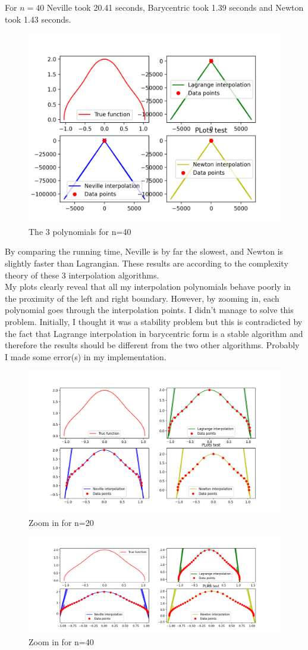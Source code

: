 \documentclass[12pt]{article}
\begin{document}
For $n=40$ Neville took 20.41 seconds, Barycentric took 1.39 seconds and Newton took 1.43 seconds. \\

\begin{figure}[h!]
	\centering
	\includegraphics[width=0.7\columnwidth]{n=40}
	\caption{The 3 polynomials for n=40}
\end{figure}

By comparing the running time, Neville is by far the slowest, and Newton is slightly faster than Lagrangian. These results are according to the complexity theory of these 3 interpolation algorithms.\\

My plots clearly reveal that all my interpolation polynomials behave poorly in the proximity of the left and right boundary. However, by zooming in, each polynomial goes through the interpolation points. I didn't manage to solve this problem. Initially, I thought it was a stability problem but this is contradicted by the fact that Lagrange interpolation in barycentric form is a stable algorithm and therefore the results should be different from the two other algorithms. Probably I made some error(s) in my implementation. \\

\begin{figure}[h!]
	\centering
	\includegraphics[width=0.7\columnwidth]{zoomin_n=20}
	\caption{Zoom in for n=20}
\end{figure}

\begin{figure}[h!]
	\centering
	\includegraphics[width=0.7\columnwidth]{zoomin_n=40}
	\caption{Zoom in for n=40}
\end{figure}
\end{document}
